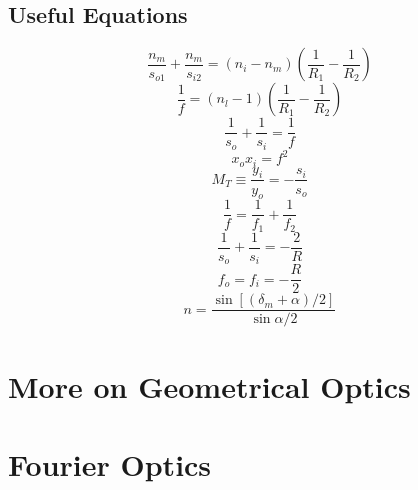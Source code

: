 \documentclass[12pt]{report}
\begin{document}
\section{Useful Equations}
\[\frac{n_m}{s_{o1}}+\frac{n_m}{s_{i2}} = (n_i-n_m)\left(\frac{1}{R_1}-\frac{1}{R_2}\right)\]
\[\frac{1}{f} = (n_l - 1)\left(\frac{1}{R_1}-\frac{1}{R_2}\right)\]
\[\frac{1}{s_o}+\frac{1}{s_i} = \frac{1}{f}\]
\[x_ox_i = f^2\]
\[M_T \equiv \frac{y_i}{y_o} = -\frac{s_i}{s_o}\]
\[\frac{1}{f} = \frac{1}{f_1}+\frac{1}{f_2}\]
\[\frac{1}{s_o}+\frac{1}{s_i} = -\frac{2}{R}\]
\[f_o = f_i = -\frac{R}{2} \]
\[n = \frac{\sin [(\delta_m+\alpha)/2]}{\sin \alpha/2}\]


\chapter{More on Geometrical Optics}
\chapter{Fourier Optics}
\end{document}
